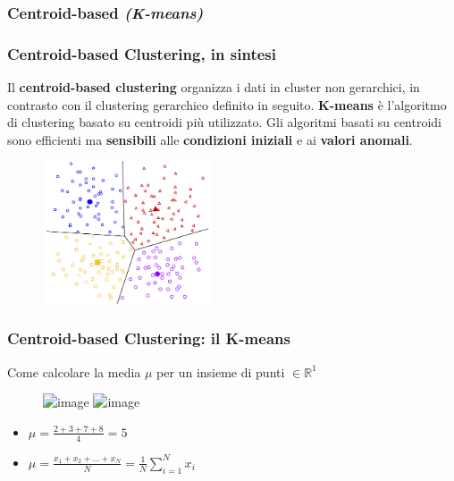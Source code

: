 
\subsubsection[Centroid-based (K-means)]{Centroid-based \textit{(K-means)}}
\begin{frame}

	\frametitle{{\color{GradientDescentDiagramBlue}Centroid-based Clustering}, in sintesi}

		Il \textbf{centroid-based clustering} organizza i dati in cluster non gerarchici, in contrasto con il clustering gerarchico definito in seguito. \textbf{K-means} è l'algoritmo di clustering basato su centroidi più utilizzato.
		\newlinedouble
		Gli algoritmi basati su centroidi sono efficienti ma \textbf{sensibili} alle \textbf{condizioni iniziali} e ai \textbf{valori anomali}.

		\begin{figure}[!htbp]
			\centering
			\includegraphics[width=5.0cm]{images/unsupervised/types/Clustering_CentroidBased.pdf}
		\end{figure}

\end{frame}



\begin{frame}

	\frametitle{{\color{GradientDescentDiagramBlue}Centroid-based Clustering}: il K-means}

	\begin{scriptsize}
	\begin{block}{Come calcolare la media $\mu$ per un insieme di punti $\in \mathbb{R}^1$}
		\begin{figure}[!htbp]
			\centering
			\includegraphics<1>[width=0.7\linewidth]{images/unsupervised/kmeans/mean_r1.png}
			\includegraphics<2>[width=0.7\linewidth]{images/unsupervised/kmeans/mean_r1_mean.png}
		\end{figure}
		
		\begin{itemize}
	        \item<1-> $\mu = \frac{2+3+7+8}{4} = 5$	       
	        \item<2-> $\mu = \frac{x_1 + x_2 + ... + x_N}{N} = \frac{1}{N}\sum_{i=1}^{N} x_i$
	    \end{itemize}

	\end{block}
	\end{scriptsize}
	
\end{frame}

